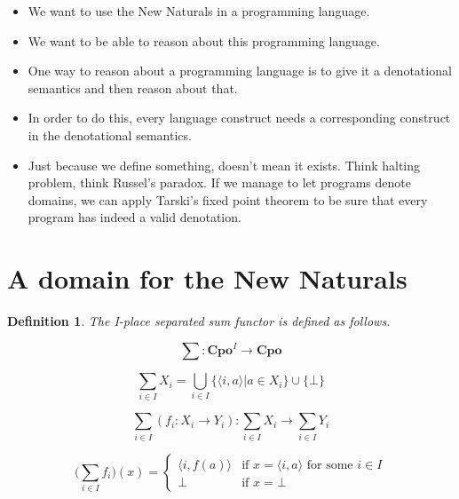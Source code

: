 \documentclass[a4paper]{article}
\newcommand{\arr}{\rightarrow}
\newtheorem{defNplaceSeparatedSum}[defNuF]{Definition}
\begin{document}
\begin{itemize}

\item We want to use the New Naturals in a programming language.

\item We want to be able to reason about this programming language.

\item One way to reason about a programming language is to give it a
denotational semantics and then reason about that.

\item In order to do this, every language construct needs a corresponding
construct in the denotational semantics.

\item Just because we define something, doesn't mean it exists.  Think halting
problem, think Russel's paradox. If we manage to let programs denote domains,
we can apply Tarski's fixed point theorem to be sure that every program has
indeed a valid denotation.

\end{itemize}

\section{A domain for the New Naturals}

\begin{defNplaceSeparatedSum}

The I-place separated sum functor is defined as follows.

\begin{equation}
\sum : \mathbf{Cpo}^I \arr \mathbf{Cpo} \nonumber
\end{equation}

\begin{equation}
\sum_{i \in I}{X_i} =
  \bigcup_{i \in I} \{ \langle i, a \rangle | a \in X_i \}
  \cup \{ \bot \} \nonumber
\end{equation}

\begin{equation}
\sum_{i \in I}{(f_i : X_i \arr Y_i)} :
  \sum_{i \in I}{X_i} \arr \sum_{i \in I}{Y_i}
\end{equation}

\begin{equation*}
(\sum_{i \in I}{f_i)(x)} = \left\{
  \begin{array}{rl}
     \langle i, f(a) \rangle & \text{if } x = \langle i, a \rangle
                               \text{ for some } i \in I \\
    \bot                     & \text{if } x = \bot
  \end{array} \right.
\end{equation*}

\end{defNplaceSeparatedSum}
\end{document}
